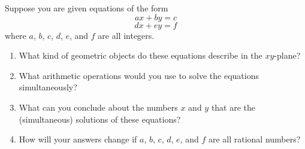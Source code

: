 \documentclass[nooutcomes,instructornotes]{ximera}
\begin{document}
\begin{problem}
Suppose you are given equations of the form 
$$ax+by = c$$
$$dx+ey=f$$
where $a$, $b$, $c$, $d$, $e$, and $f$ are all integers.  
\begin{enumerate}
\item What kind of geometric objects do these equations describe in the $xy$-plane?  
\item What arithmetic operations would you use to solve the equations simultaneously? 
\item What can you conclude about the numbers $x$ and $y$ that are the (simultaneous) solutions of these equations?  
\item How will your answers change if $a$, $b$, $c$, $d$, $e$, and $f$ are all rational numbers?  
\end{enumerate}
\vfill
\end{problem}
\end{document}
